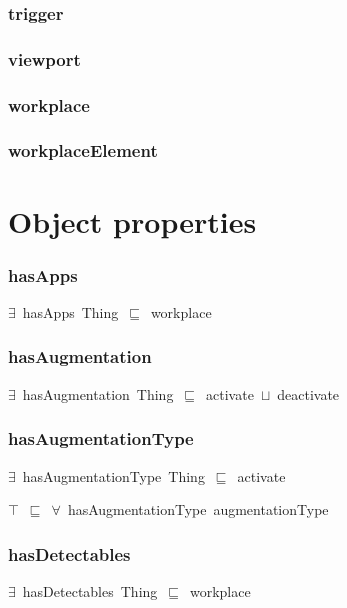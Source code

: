 \documentclass{article}
\begin{document}
\subsubsection*{trigger}

\subsubsection*{viewport}

\subsubsection*{workplace}

\subsubsection*{workplaceElement}

\section*{Object properties}\subsubsection*{hasApps}

\ensuremath{\exists}~hasApps~Thing~\ensuremath{\sqsubseteq}~workplace

\subsubsection*{hasAugmentation}

\ensuremath{\exists}~hasAugmentation~Thing~\ensuremath{\sqsubseteq}~activate~\ensuremath{\sqcup}~deactivate

\subsubsection*{hasAugmentationType}

\ensuremath{\exists}~hasAugmentationType~Thing~\ensuremath{\sqsubseteq}~activate

\ensuremath{\top}~\ensuremath{\sqsubseteq}~\ensuremath{\forall}~hasAugmentationType~augmentationType

\subsubsection*{hasDetectables}

\ensuremath{\exists}~hasDetectables~Thing~\ensuremath{\sqsubseteq}~workplace
\end{document}
